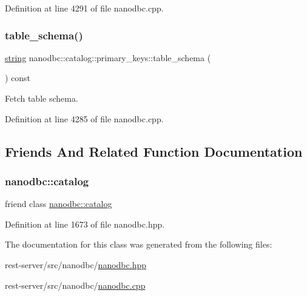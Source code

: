 Definition at line 4291 of file nanodbc.\+cpp.

\mbox{\label{classnanodbc_1_1catalog_1_1primary__keys_a9e3b4c7726c653c734db68fdb3a97317}} 
\subsubsection{\texorpdfstring{table\_schema()}{table\_schema()}}
{\footnotesize\ttfamily \mbox{\hyperlink{namespacenanodbc_abfc0ece56278e590911ec8352774c212}{string}} nanodbc\+::catalog\+::primary\+\_\+keys\+::table\+\_\+schema (\begin{DoxyParamCaption}{ }\end{DoxyParamCaption}) const}



Fetch table schema. 



Definition at line 4285 of file nanodbc.\+cpp.



\subsection{Friends And Related Function Documentation}
\mbox{\label{classnanodbc_1_1catalog_1_1primary__keys_af0f3134c7f6f1f36bfe1e247318dfe43}} 
\subsubsection{\texorpdfstring{nanodbc::catalog}{nanodbc::catalog}}
{\footnotesize\ttfamily friend class \mbox{\hyperlink{classnanodbc_1_1catalog}{nanodbc\+::catalog}}\hspace{0.3cm}{\ttfamily [friend]}}



Definition at line 1673 of file nanodbc.\+hpp.



The documentation for this class was generated from the following files\+:\begin{DoxyCompactItemize}
\item 
rest-\/server/src/nanodbc/\mbox{\hyperlink{nanodbc_8hpp}{nanodbc.\+hpp}}\item 
rest-\/server/src/nanodbc/\mbox{\hyperlink{nanodbc_8cpp}{nanodbc.\+cpp}}\end{DoxyCompactItemize}
